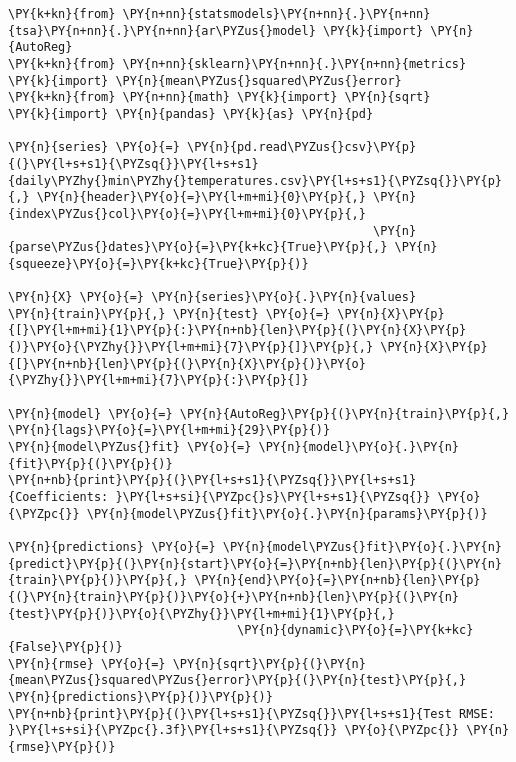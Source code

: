 \begin{tcolorbox}[breakable, size=fbox, boxrule=1pt, pad at break*=1mm,colback=cellbackground, colframe=cellborder]
\begin{Verbatim}[commandchars=\\\{\}]
\PY{k+kn}{from} \PY{n+nn}{statsmodels}\PY{n+nn}{.}\PY{n+nn}{tsa}\PY{n+nn}{.}\PY{n+nn}{ar\PYZus{}model} \PY{k}{import} \PY{n}{AutoReg}
\PY{k+kn}{from} \PY{n+nn}{sklearn}\PY{n+nn}{.}\PY{n+nn}{metrics} \PY{k}{import} \PY{n}{mean\PYZus{}squared\PYZus{}error}
\PY{k+kn}{from} \PY{n+nn}{math} \PY{k}{import} \PY{n}{sqrt}
\PY{k}{import} \PY{n}{pandas} \PY{k}{as} \PY{n}{pd}

\PY{n}{series} \PY{o}{=} \PY{n}{pd.read\PYZus{}csv}\PY{p}{(}\PY{l+s+s1}{\PYZsq{}}\PY{l+s+s1}{daily\PYZhy{}min\PYZhy{}temperatures.csv}\PY{l+s+s1}{\PYZsq{}}\PY{p}{,} \PY{n}{header}\PY{o}{=}\PY{l+m+mi}{0}\PY{p}{,} \PY{n}{index\PYZus{}col}\PY{o}{=}\PY{l+m+mi}{0}\PY{p}{,}
                                                   \PY{n}{parse\PYZus{}dates}\PY{o}{=}\PY{k+kc}{True}\PY{p}{,} \PY{n}{squeeze}\PY{o}{=}\PY{k+kc}{True}\PY{p}{)}

\PY{n}{X} \PY{o}{=} \PY{n}{series}\PY{o}{.}\PY{n}{values}
\PY{n}{train}\PY{p}{,} \PY{n}{test} \PY{o}{=} \PY{n}{X}\PY{p}{[}\PY{l+m+mi}{1}\PY{p}{:}\PY{n+nb}{len}\PY{p}{(}\PY{n}{X}\PY{p}{)}\PY{o}{\PYZhy{}}\PY{l+m+mi}{7}\PY{p}{]}\PY{p}{,} \PY{n}{X}\PY{p}{[}\PY{n+nb}{len}\PY{p}{(}\PY{n}{X}\PY{p}{)}\PY{o}{\PYZhy{}}\PY{l+m+mi}{7}\PY{p}{:}\PY{p}{]}

\PY{n}{model} \PY{o}{=} \PY{n}{AutoReg}\PY{p}{(}\PY{n}{train}\PY{p}{,} \PY{n}{lags}\PY{o}{=}\PY{l+m+mi}{29}\PY{p}{)}
\PY{n}{model\PYZus{}fit} \PY{o}{=} \PY{n}{model}\PY{o}{.}\PY{n}{fit}\PY{p}{(}\PY{p}{)}
\PY{n+nb}{print}\PY{p}{(}\PY{l+s+s1}{\PYZsq{}}\PY{l+s+s1}{Coefficients: }\PY{l+s+si}{\PYZpc{}s}\PY{l+s+s1}{\PYZsq{}} \PY{o}{\PYZpc{}} \PY{n}{model\PYZus{}fit}\PY{o}{.}\PY{n}{params}\PY{p}{)}

\PY{n}{predictions} \PY{o}{=} \PY{n}{model\PYZus{}fit}\PY{o}{.}\PY{n}{predict}\PY{p}{(}\PY{n}{start}\PY{o}{=}\PY{n+nb}{len}\PY{p}{(}\PY{n}{train}\PY{p}{)}\PY{p}{,} \PY{n}{end}\PY{o}{=}\PY{n+nb}{len}\PY{p}{(}\PY{n}{train}\PY{p}{)}\PY{o}{+}\PY{n+nb}{len}\PY{p}{(}\PY{n}{test}\PY{p}{)}\PY{o}{\PYZhy{}}\PY{l+m+mi}{1}\PY{p}{,} 
                                \PY{n}{dynamic}\PY{o}{=}\PY{k+kc}{False}\PY{p}{)}
\PY{n}{rmse} \PY{o}{=} \PY{n}{sqrt}\PY{p}{(}\PY{n}{mean\PYZus{}squared\PYZus{}error}\PY{p}{(}\PY{n}{test}\PY{p}{,} \PY{n}{predictions}\PY{p}{)}\PY{p}{)}
\PY{n+nb}{print}\PY{p}{(}\PY{l+s+s1}{\PYZsq{}}\PY{l+s+s1}{Test RMSE: }\PY{l+s+si}{\PYZpc{}.3f}\PY{l+s+s1}{\PYZsq{}} \PY{o}{\PYZpc{}} \PY{n}{rmse}\PY{p}{)}


\end{Verbatim}
\end{tcolorbox}
